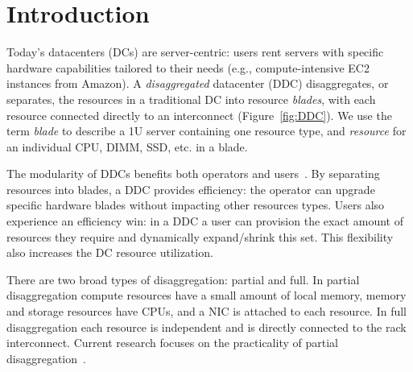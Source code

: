 
\section{Introduction} 
\label{sec:intro}
Today's datacenters (DCs) are server-centric: users rent servers with
specific hardware capabilities tailored to their needs (e.g.,
compute-intensive EC2 instances from Amazon). 
A \emph{disaggregated} datacenter (DDC) disaggregates, or separates,
the resources in a traditional DC into resource \emph{blades},
with each resource connected directly to an interconnect (Figure~\ref{fig:DDC}). 
We use the term \emph{blade} to describe a 1U server containing one resource
type, and \emph{resource} for an individual CPU, DIMM, SSD, etc. in a blade. 


The modularity of DDCs benefits both operators and
users~\cite{Han2013}. By separating resources into blades, a
DDC provides efficiency: the operator can upgrade specific hardware
blades without impacting other resources types. Users also experience
an efficiency win: in a DDC a user can provision the exact amount of
resources they require and dynamically expand/shrink this set. This flexibility
also increases the DC resource utilization.




There are two broad types of disaggregation: partial and full.
In partial disaggregation compute resources have a small amount of
local memory, %
memory and storage resources have CPUs, %
and a NIC is attached to each resource. 
In full disaggregation each resource is independent and is directly
connected to the rack interconnect. Current research focuses on the practicality
of partial disaggregation~\cite{IntelRSA,Gao2016,Lim2009,Lim2012}.

